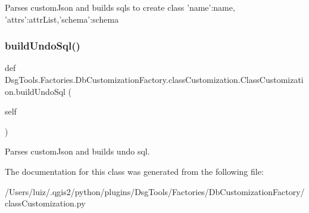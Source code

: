 \begin{DoxyVerb}Parses customJson and builds sqls to create class
{'name':name, 'attrs':attrList,'schema':schema}
\end{DoxyVerb}
 \mbox{\label{class_dsg_tools_1_1_factories_1_1_db_customization_factory_1_1class_customization_1_1_class_customization_a9a43c41edc66ec706de8b6238662e90e}} 
\subsubsection{\texorpdfstring{build\+Undo\+Sql()}{buildUndoSql()}}
{\footnotesize\ttfamily def Dsg\+Tools.\+Factories.\+Db\+Customization\+Factory.\+class\+Customization.\+Class\+Customization.\+build\+Undo\+Sql (\begin{DoxyParamCaption}\item[{}]{self }\end{DoxyParamCaption})}

\begin{DoxyVerb}Parses customJson and builds undo sql.
\end{DoxyVerb}
 

The documentation for this class was generated from the following file\+:\begin{DoxyCompactItemize}
\item 
/\+Users/luiz/.\+qgis2/python/plugins/\+Dsg\+Tools/\+Factories/\+Db\+Customization\+Factory/class\+Customization.\+py\end{DoxyCompactItemize}
